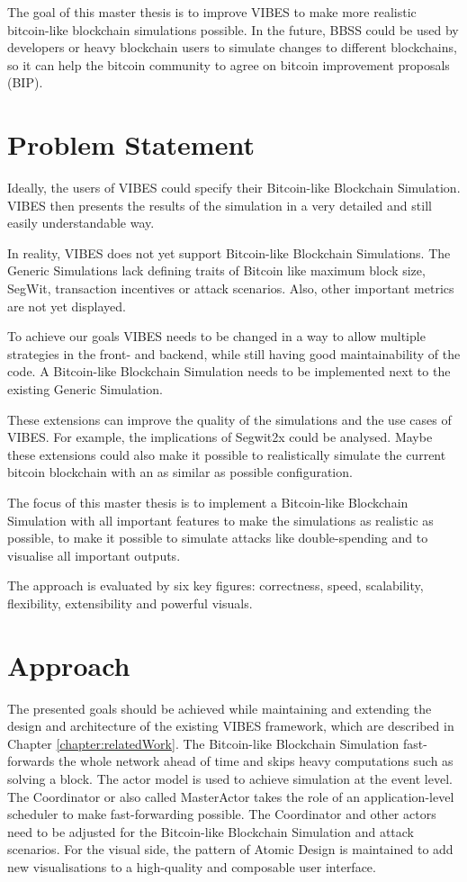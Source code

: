 The goal of this master thesis is to improve VIBES to make more realistic bitcoin-like blockchain simulations possible. In the future, BBSS could be used by developers or heavy blockchain users to simulate changes to different blockchains, so it can help the bitcoin community to agree on bitcoin improvement proposals (BIP).

\section{Problem Statement} 
\label{sec:problemStatement}
Ideally, the users of VIBES could specify their Bitcoin-like Blockchain Simulation. VIBES then presents the results of the simulation in a very detailed and still easily understandable way.

In reality, VIBES does not yet support Bitcoin-like Blockchain Simulations. The Generic Simulations lack defining traits of Bitcoin like maximum block size, SegWit, transaction incentives or attack scenarios. Also, other important metrics are not yet displayed.

To achieve our goals VIBES needs to be changed in a way to allow multiple strategies in the front- and backend, while still having good maintainability of the code. A Bitcoin-like Blockchain Simulation needs to be implemented next to the existing Generic Simulation.

These extensions can improve the quality of the simulations and the use cases of VIBES. For example, the implications of Segwit2x could be analysed. Maybe these extensions could also make it possible to realistically simulate the current bitcoin blockchain with an as similar as possible configuration.

The focus of this master thesis is to implement a Bitcoin-like Blockchain Simulation with all important features to make the simulations as realistic as possible, to make it possible to simulate attacks like double-spending and to visualise all important outputs.

The approach is evaluated by six key figures: correctness, speed,
scalability, flexibility, extensibility and powerful visuals.

\section{Approach}
 \label{sec:approach}
The presented goals should be achieved while maintaining and extending the design and architecture of the existing VIBES framework, which are described in Chapter \ref{chapter:relatedWork}. The Bitcoin-like Blockchain Simulation fast-forwards the whole network ahead of time and skips heavy computations such as solving a block. The actor model is used to achieve simulation at the event level. The Coordinator or also called MasterActor takes the role of an application-level scheduler to make fast-forwarding possible. The Coordinator and other actors need to be adjusted for the Bitcoin-like Blockchain Simulation and attack scenarios. For the visual side, the pattern of Atomic Design \cite{atomicdesign} is maintained to add new visualisations to a high-quality and composable user interface.

